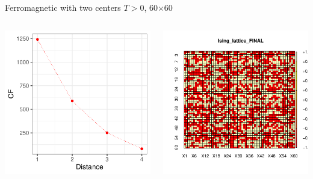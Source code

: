 \documentclass{beamer}
\begin{document}
\begin{frame}{Ferromagnetic with two centers $T>0$,  60$\times$60}
\begin{columns}
\begin{column}{0.3\textwidth}
              \begin{center}
     \includegraphics[width=\textwidth]{Pic/J+1_60_10000_T=4_FINAL_COHERENCE.pdf}
     \end{center}
\end{column}
\begin{column}{0.3\textwidth}
    \begin{center}
     \includegraphics[width=\textwidth]{Pic/J+1_60_10000_T=8_FINAL.pdf}

\end{center}
\end{column}
\end{columns}
\end{frame}
\end{document}

